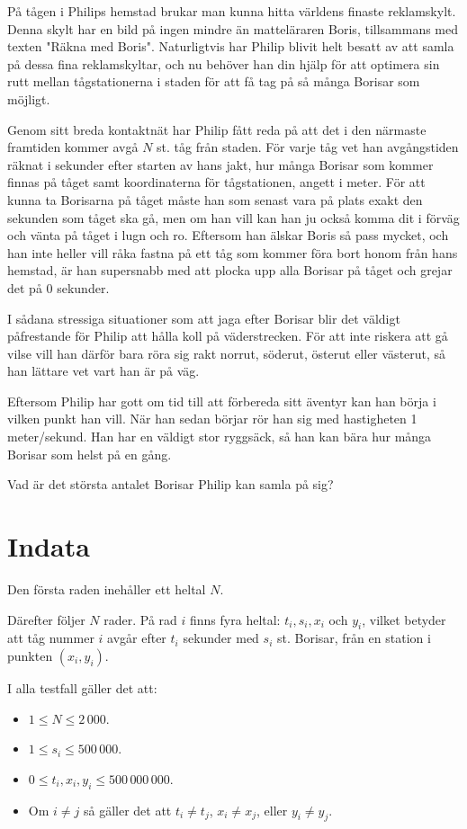 
På tågen i Philips hemstad brukar man kunna hitta världens finaste reklamskylt. Denna skylt har en bild på ingen mindre än matteläraren Boris, tillsammans med texten "Räkna med Boris". 
Naturligtvis har Philip blivit helt besatt av att samla på dessa fina reklamskyltar, och nu behöver han din hjälp för att optimera sin rutt mellan tågstationerna i staden för att få tag på så många Borisar som möjligt.

Genom sitt breda kontaktnät har Philip fått reda på att det i den närmaste framtiden kommer avgå $N$ st. tåg från staden. För varje tåg vet han avgångstiden räknat i sekunder efter starten av hans jakt, hur många Borisar som kommer finnas på tåget samt koordinaterna för tågstationen, angett i meter. 
För att kunna ta Borisarna på tåget måste han som senast vara på plats exakt den sekunden som tåget ska gå, men om han vill kan han ju också komma dit i förväg och vänta på tåget i lugn och ro. 
Eftersom han älskar Boris så pass mycket, och han inte heller vill råka fastna på ett tåg som kommer föra bort honom från hans hemstad, är han supersnabb med att plocka upp alla Borisar på tåget och grejar det på 0 sekunder.

I sådana stressiga situationer som att jaga efter Borisar blir det väldigt påfrestande för Philip att hålla koll på väderstrecken. För att inte riskera att gå vilse vill han därför bara röra sig rakt norrut, söderut, österut eller västerut, så han lättare vet vart han är på väg.

Eftersom Philip har gott om tid till att förbereda sitt äventyr kan han börja i vilken punkt han vill. När han sedan börjar rör han sig med hastigheten 1 meter/sekund. Han har en väldigt stor ryggsäck, så han kan bära hur många Borisar som helst på en gång.

Vad är det största antalet Borisar Philip kan samla på sig?

\section*{Indata}
Den första raden inehåller ett heltal $N$. 

Därefter följer $N$ rader. På rad $i$ finns fyra heltal: $t_{i}, s_{i}, x_{i}$ och $y_{i}$, vilket betyder att tåg nummer $i$ avgår efter $t_{i}$ sekunder med $s_{i}$ st. Borisar, från en station i punkten $(x_{i},y_{i})$.

I alla testfall gäller det att:
\begin{itemize}
  \item $1 \le N \le 2\,000$.
  \item $1 \le s_{i} \le 500\,000$.
  \item $0 \le t_{i}, x_{i}, y_{i} \le 500\,000\,000$.
  \item Om $i \neq j$ så gäller det att
    $t_{i} \neq t_{j}$,
    $x_{i} \neq x_{j}$, eller
    $y_{i} \neq y_{j}$.
\end{itemize}


